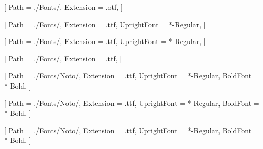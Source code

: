 [
Path = ./Fonts/,
Extension = .otf,
]

[
Path = ./Fonts/,
Extension = .ttf,
UprightFont = *-Regular,
]

[
Path = ./Fonts/,
Extension = .ttf,
UprightFont = *-Regular,
]

[
Path = ./Fonts/,
Extension = .ttf,
]

[
Path = ./Fonts/Noto/,
Extension = .ttf,
UprightFont = *-Regular,
BoldFont = *-Bold,
]

[
Path = ./Fonts/Noto/,
Extension = .ttf,
UprightFont = *-Regular,
BoldFont = *-Bold,
]

[
Path = ./Fonts/Noto/,
Extension = .ttf,
UprightFont = *-Regular,
BoldFont = *-Bold,
]


